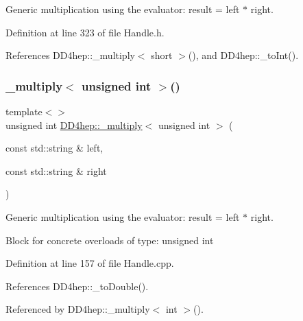 Generic multiplication using the evaluator\+: result = left $\ast$ right. 



Definition at line 323 of file Handle.\+h.



References D\+D4hep\+::\+\_\+multiply$<$ short $>$(), and D\+D4hep\+::\+\_\+to\+Int().

\hypertarget{group___d_d4_h_e_p___g_e_o_m_e_t_r_y_gadadc5362c0b144ed5f567870a1319542}{}\label{group___d_d4_h_e_p___g_e_o_m_e_t_r_y_gadadc5362c0b144ed5f567870a1319542} 
\subsubsection{\texorpdfstring{\+\_\+multiply$<$ unsigned int $>$()}{\_multiply< unsigned int >()}\hspace{0.1cm}{\footnotesize\ttfamily [1/3]}}
{\footnotesize\ttfamily template$<$$>$ \\
unsigned int \hyperlink{group___d_d4_h_e_p___g_e_o_m_e_t_r_y_gab860c2299e2eb50e537c5079fb0c9c51}{D\+D4hep\+::\+\_\+multiply}$<$ unsigned int $>$ (\begin{DoxyParamCaption}\item[{const std\+::string \&}]{left,  }\item[{const std\+::string \&}]{right }\end{DoxyParamCaption})}



Generic multiplication using the evaluator\+: result = left $\ast$ right. 

Block for concrete overloads of type\+: unsigned int 

Definition at line 157 of file Handle.\+cpp.



References D\+D4hep\+::\+\_\+to\+Double().



Referenced by D\+D4hep\+::\+\_\+multiply$<$ int $>$().

\hypertarget{group___d_d4_h_e_p___g_e_o_m_e_t_r_y_gabf5e7c3cd63e84fef4d9267494b78659}{}\label{group___d_d4_h_e_p___g_e_o_m_e_t_r_y_gabf5e7c3cd63e84fef4d9267494b78659} 
